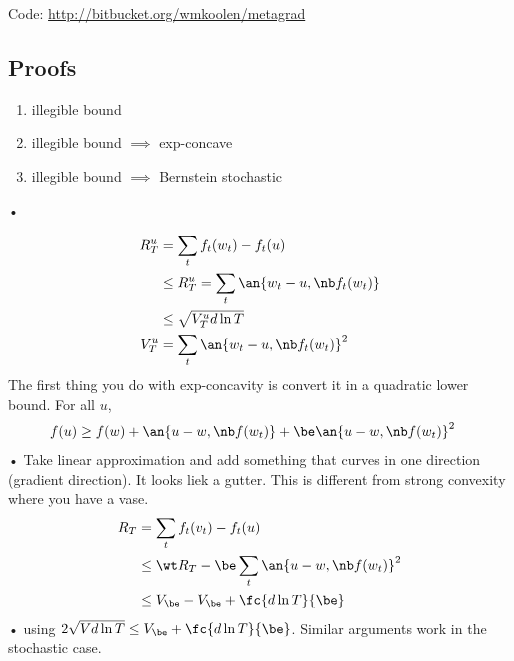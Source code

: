 Code: \url{http://bitbucket.org/wmkoolen/metagrad}

\subsection{Proofs}

\begin{enumerate}
\item
illegible bound
\item
illegible bound $\implies$ exp-concave
\item
illegible bound $\implies$ Bernstein stochastic
\end{enumerate}•



\begin{align}
R_T^u &= \sum_t f_t(w_t) - f_t(u)\\
&\le R_T^u = \sum_t \an{w_t-u,\nb f_t(w_t)}\\
&\le \sqrt{V_T^u d\ln T}\\
V_T^u &=\sum_t \an{w_t-u, \nb f_t(w_t)}^2
\end{align}
The first thing you do with exp-concavity is convert it in a quadratic lower bound. For all $u$,
\begin{align}
f(u) &\ge f(w) + \an{u-w,\nb f(w_t)} + \be \an{u-w, \nb f(w_t)}^2
\end{align}•
Take linear approximation and add something that curves in one direction (gradient direction). It looks liek a gutter. This is different from strong convexity where you have a vase. %
\begin{align}
R_T &= \sum_t f_t(v_t) - f_t(u)\\
&\le \wt R_T - \be \sum_t \an{u-w,\nb f(w_t)}^2\\
&\le V_\be - V_\be + \fc{d\ln T}{\be}
\end{align}•
using $2\sqrt{Vd \ln T} \le V_\be + \fc{d\ln T}{\be}$. Similar arguments work in the stochastic case.

\printbibliography


